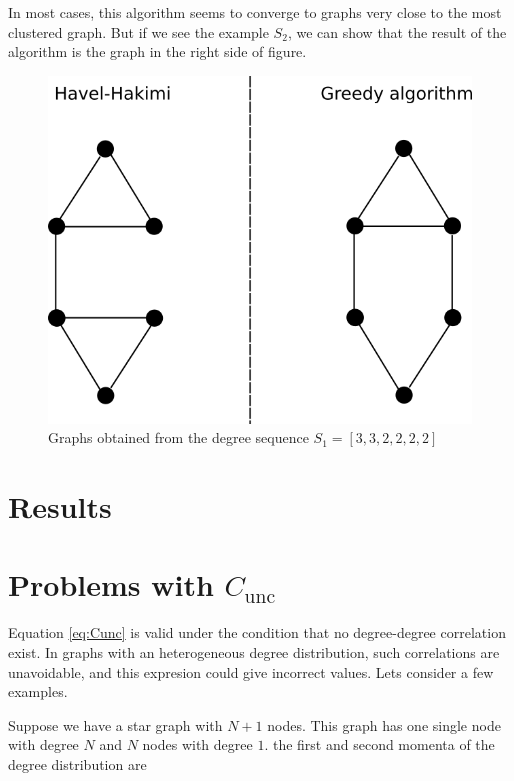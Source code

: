 \documentclass{article}
\begin{document}
In most cases, this algorithm seems to converge to graphs very close to the most clustered graph. But if we see the example $S_2$, we can show that the result of the algorithm is the graph in the right side of figure.

\begin{figure}[ht!]
\centering
\includegraphics[scale=0.8]{./figs/graph_332222.png}
\caption{Graphs obtained from the degree sequence $S_1 = [3, 3, 2, 2, 2, 2]$}
\label{fig:graph_332222}
\end{figure}


\section{Results}

\appendix
\section{Problems with $C_{\mathrm{unc}}$} \label{app:Cunc}

Equation \ref{eq:Cunc} is valid under the condition that no degree-degree correlation exist. In graphs with an heterogeneous degree distribution, such correlations are unavoidable, and this expresion could give incorrect values. Lets consider a few examples. 

Suppose we have a star graph with $N+1$ nodes. This graph has one single node with degree $N$ and $N$ nodes with degree $1$. the first and second momenta of the degree distribution are 
\end{document}
